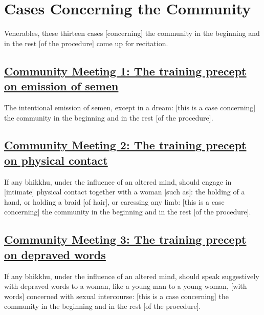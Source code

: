 
\section{Cases Concerning the Community}
\label{comm}

\begin{intro}
	Venerables, these thirteen cases [concerning] the community in the beginning and in the rest [of the procedure] come up for recitation.
\end{intro}

\subsection*{\hyperref[sd1]{Community Meeting 1: The training precept on emission of semen}}
\label{comm1}

The intentional emission of semen, except in a dream: [this is a case concerning] the community in the beginning and in the rest [of the procedure].



\subsection*{\hyperref[sd2]{Community Meeting 2: The training precept on physical contact}}
\label{comm2}

If any bhikkhu, under the influence of an altered mind, should engage in [intimate] physical contact together with a woman [such as]: the holding of a hand, or holding a braid [of hair], or caressing any limb: [this is a case concerning] the community in the beginning and in the rest [of the procedure].



\subsection*{\hyperref[sd3]{Community Meeting 3: The training precept on depraved words}}
\label{comm3}

If any bhikkhu, under the influence of an altered mind, should speak suggestively with depraved words to a woman, like a young man to a young woman, [with words] concerned with sexual intercourse: [this is a case concerning] the community in the beginning and in the rest [of the procedure].



